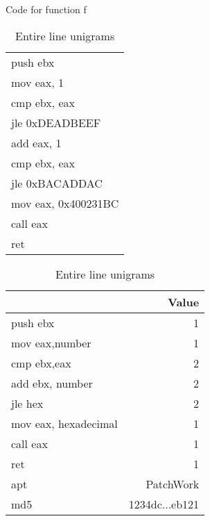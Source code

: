\begin{table}[!htb]
\begin{minipage}{.5\linewidth}
	\centering
	
	\caption{Code for function f}
	\label{tab:function_f}
	
	\medskip
	
	\begin{tabular}{ l } 
		\toprule
		push ebx \\
		mov eax, 1\\
		cmp ebx, eax\\
		jle 0xDEADBEEF\\
		add eax, 1\\
		cmp ebx, eax\\
		jle 0xBACADDAC\\
		mov eax, 0x400231BC\\
		call eax\\
		ret\\
	
		
		\bottomrule
	\end{tabular}
\end{minipage}\hfill
\begin{minipage}{.5\linewidth}
	\centering
	
	\caption{Entire line unigrams}
	\label{tab:line_unigrams}
	
	\medskip
	
	\begin{tabular}{  lr } 
		\toprule
		\makecell{ Feature }  &  Value \\   
		
		\midrule push ebx       & 1         \\
		mov eax,number & 1                  \\ 
		cmp ebx,eax    & 2                  \\ 
		add ebx, number     & 2                  \\ 
		jle hex        & 2                  \\
		mov eax, hexadecimal & 1\\ 
		call eax       & 1                  \\
		ret & 1\\ 
		apt            & PatchWork          \\ 
		md5            & 1234dc...eb121 \\ 
		\bottomrule
	\end{tabular}
\end{minipage}
\end{table}


